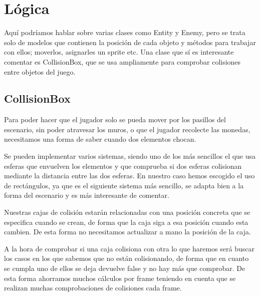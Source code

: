 \documentclass[parskip=half*]{scrartcl}
\begin{document}

\newpage
\section{L\'ogica}
	Aqu\'i podr\'iamos hablar sobre varias clases como Entity y Enemy, pero se trata solo de modelos que contienen la posici\'on de cada objeto y m\'etodos para trabajar con ellos; moverlos, asignarles un sprite etc. Una clase que s\'i es interesante comentar es CollisionBox, que se usa ampliamente para comprobar colisiones entre objetos del juego.
	\subsection{CollisionBox}
	Para poder hacer que el jugador solo se pueda mover por los pasillos del escenario, sin poder atravesar los muros, o que el jugador recolecte las monedas, necesitamos una forma de saber cuando dos elementos chocan.

	Se pueden implementar varios sistemas, siendo uno de los m\'as sencillos el que usa esferas que envuelven los elementos y que comprueba si dos esferas colisionan mediante la distancia entre las dos esferas. En nuestro caso hemos escogido el uso de rectángulos, ya que es el siguiente sistema más sencillo, se adapta bien a la forma del escenario y es m\'as interesante de comentar.

	Nuestras cajas de colisi\'on estar\'an relacionadas con una posici\'on concreta que se especifica cuando se crean, de forma que la caja siga a esa posici\'on cuando esta cambien. De esta forma no necesitamos actualizar a mano la posici\'on de la caja.

	A la hora de comprobar si una caja colisiona con otra lo que haremos ser\'a buscar los casos en los que sabemos que no est\'an colisionando, de forma que en cuanto se cumpla uno de ellos se deja devuelve false y no hay m\'as que comprobar. De esta forma ahorramos muchos c\'alculos por frame teniendo en cuenta que se realizan muchas comprobaciones de colisiones cada frame.
\end{document}
